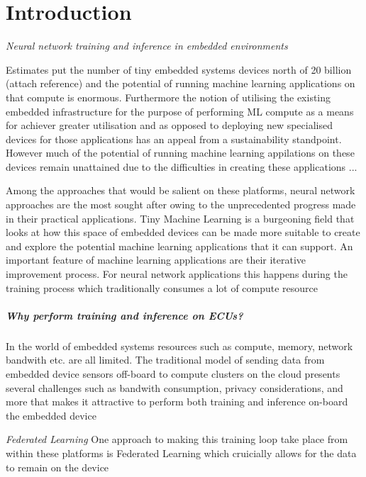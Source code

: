 \part{Introduction}

\textit{Neural network training and inference in embedded environments}

{\color{red}
	Estimates put the number of tiny embedded systems devices north of 20 billion (attach reference) and the potential of running machine learning applications on that compute is enormous. Furthermore the notion of utilising the existing embedded infrastructure for the purpose of performing ML compute as a means for achiever greater utilisation and as opposed to deploying new specialised devices for those applications has an appeal from a sustainability standpoint. However much of the potential of running machine learning appilations on these devices remain unattained due to the difficulties in creating these applications ...

	Among the approaches that would be salient on these platforms, neural network approaches are the most sought after owing to the unprecedented progress made in their practical applications. Tiny Machine Learning is a burgeoning field that looks at how this space of embedded devices can be made more suitable to create and explore the potential machine learning applications that it can support. An important feature of machine learning applications are their iterative improvement process. For neural network applications this happens during the training process which traditionally consumes a lot of compute resource
}

\subsubsection{Why perform training and inference on ECUs?}

In the world of embedded systems resources such as compute, memory, network bandwith etc. are all limited. The traditional model of sending data from embedded device sensors off-board to compute clusters on the cloud presents several challenges such as bandwith consumption, privacy considerations, and more that makes it attractive to perform both training and inference on-board the embedded device

{\color{red}
	\textit{Federated Learning}
One approach to making this training loop take place from within these platforms is Federated Learning which cruicially allows for the data to remain on the device
}

